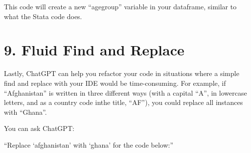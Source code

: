 \documentclass[
  letterpaper,
  DIV=11,
  numbers=noendperiod]{scrreprt}
\begin{document}
This code will create a new ``agegroup'' variable in your dataframe,
similar to what the Stata code does.

\section{9. Fluid Find and Replace}\label{fluid-find-and-replace}

Lastly, ChatGPT can help you refactor your code in situations where a
simple find and replace with your IDE would be time-consuming. For
example, if ``Afghanistan'' is written in three different ways (with a
capital ``A'', in lowercase letters, and as a country code inthe title,
``AF''), you could replace all instances with ``Ghana''.

You can ask ChatGPT:

``Replace `afghanistan' with `ghana' for the code below:''
\end{document}

